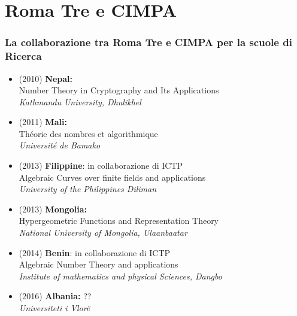 \documentclass[10pt,final]{beamer} %
\begin{document}
\section{Roma Tre e CIMPA} 
\begin{frame}
\frametitle{La collaborazione tra Roma Tre e CIMPA per la scuole di Ricerca}

\begin{itemize}
 \item (2010) \textbf{Nepal:}\\
Number Theory in Cryptography and Its Applications\\
\textsl{Kathmandu University, Dhulikhel}
\item (2011) \textbf{Mali:}\\ 
Th\'eorie des nombres et algorithmique\\
\textsl{Universit\'e de Bamako}
 \item (2013) \textbf{Filippine}: in collaborazione di ICTP\\ 
Algebraic Curves over finite fields and applications\\
\textsl{University of the Philippines Diliman}
\item (2013) \textbf{Mongolia:}\\
Hypergeometric Functions and Representation Theory\\
\textsl{National University of Mongolia, Ulaanbaatar}
\item (2014) \textbf{Benin}: in collaborazione di ICTP\\ 
Algebraic Number Theory and applications\\
\textsl{Institute of mathematics and physical Sciences, Dangbo}
 \item (2016) \textbf{Albania:} ??\\
\textsl{Universiteti i Vlor\"e}
\end{itemize}
\end{frame}
\end{document}
